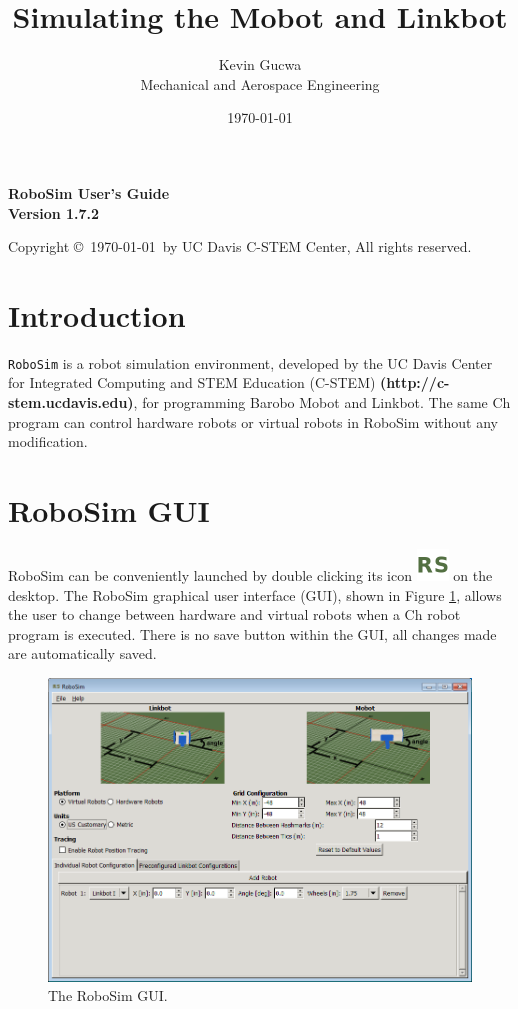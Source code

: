 \documentclass{article}
\title{Simulating the Mobot and Linkbot}
\author{Kevin Gucwa\\Mechanical and Aerospace Engineering}
\date{\today}
\begin{document}
\begin{center}
{\Huge\sf\bf RoboSim User's Guide}\\
\vspace*{2.5cm}
{\Large\bf Version 1.7.2}
\vspace{4in}

Copyright \copyright\ \today\ by UC Davis C-STEM Center, All rights reserved.

\end{center}

\newpage
\tableofcontents
\newpage

\section{Introduction}
\texttt{RoboSim} is a robot simulation environment, developed by the UC Davis
Center for Integrated Computing and STEM Education (C-STEM) {\color{blue} \bf
(http://c-stem.ucdavis.edu)}, for programming Barobo Mobot and Linkbot.  The
same Ch program  can control hardware robots or virtual robots in RoboSim
without any modification.

\section{RoboSim GUI}
\label{sec:gui}
RoboSim can be conveniently launched by double clicking its icon
\includegraphics[height=24pt]{images/robosim} on the desktop.  The RoboSim
graphical user interface (GUI), shown in Figure \ref{fig:gui}, allows the user
to change between hardware and virtual robots when a Ch robot program is
executed.  There is no save button within the GUI, all changes made are
automatically saved.
\begin{figure}[H]
	\begin{center}
		\includegraphics[width=6in]{images/gui}
	\end{center}
	\caption{The RoboSim GUI.}
	\label{fig:gui}
\end{figure}
\end{document}
